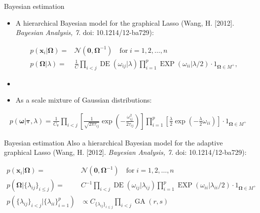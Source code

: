 \documentclass[xcolor=dvipsnames]{beamer}
\DeclareMathOperator{\DE}{DE}
\DeclareMathOperator{\EXP}{EXP}
\DeclareMathOperator{\GA}{GA}
\begin{document}
\begin{frame}{Bayesian estimation}
	\vspace{-5.5pt}
\begin{itemize}
	\item A hierarchical Bayesian model for the graphical Lasso (Wang, H. [2012]. \emph{Bayesian Analysis, 7}. doi: 10.1214/12-ba729): 
	
		\begin{align*}
		p(\textbf{x}_i|\boldsymbol{\Omega}) =& \mathcal{N}(\textbf{0},\boldsymbol{\Omega}^{-1}) \quad \text{for} \; i=1,2,\hdots,n\\
		p(\boldsymbol{\Omega}|\lambda) =& \frac{1}{C} \prod_{i<j} \DE(\omega_{ij}|\lambda) \prod_{i=1}^{p} \EXP (\omega_{ii} | \lambda / 2) \cdot 1_{\boldsymbol{\Omega}\in M^+},
		\end{align*}
	\item[]
	\item As a scale mixture of Gaussian distributions:
\end{itemize}
		\begin{align*}
		p(\boldsymbol{\omega}| \boldsymbol{\tau},\lambda)=\frac{1}{C_{\boldsymbol{\tau}}} \prod_{i<j} \left[ \frac{1}{\sqrt{2\pi \tau_{ij}}} \exp \left(- \frac{\omega_{ij}^2}{2\tau_{ij}}\right) \right] 
		\prod_{i=1}^{p}  \left[\frac{\lambda}{2} \exp \left(-\frac{\lambda}{2}\omega_{ii} \right)\right] \cdot 1_{\boldsymbol{\Omega}\in M^+}
		\end{align*}
\end{frame}

\begin{frame}{Bayesian estimation}
	\vspace{-15.5pt}
	Also a hierarchical Bayesian model for the adaptive graphical Lasso (Wang, H. [2012]. \emph{Bayesian Analysis, 7}. doi: 10.1214/12-ba729):
	
	\begin{align*}
	p(\mathbf{x}_i|\boldsymbol{\Omega}) = & \mathcal{N}(\mathbf{0,\boldsymbol{\Omega}}^{-1}) \quad \text{for} \; i=1,2,\hdots,n\\
	p(\boldsymbol{\Omega}|\{\lambda_{ij}\}_{i\leq j}) = & C^{-1} \prod_{i<j} \DE(\omega_{ij}|\lambda_{ij}) \prod_{i=1}^{p} \EXP (\omega_{ii} | \lambda_{ii} / 2) \cdot 1_{\boldsymbol{\Omega}\in M^+}\\
	p(\{\lambda_{ij}\}_{i<j}|\{\lambda_{ii}\}_{i=1}^p) &\propto C_{\{\lambda_{ij}\}_{i\leq j}} \prod_{i<j} \GA(r,s)
	\end{align*}
\end{frame}
\end{document}
